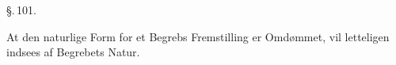\documentclass[12pt]{book}
\def\sperr#1{#1}%
\def\textit#1{#1}%
\newcommand{\sperr}[1]{\textls[180]{#1}}
\newcommand{\capitel}[2]{%
  \par\vspace{1.3\baselineskip}%
  \begin{center}
    {\large\sperr{#1}\par}\vspace{0.45\baselineskip}
    {#2\par}
  \end{center}
  \vspace{0.35\baselineskip}
  \begin{center}\rule{0.13\linewidth}{1.4pt}\end{center}
  \vspace{0.45\baselineskip}
  \phantomsection
  \addcontentsline{toc}{chapter}{\texorpdfstring{#1\ #2}{#1 #2}}%
  \markboth{#1}{#1}%
}
\newcommand{\parag}[1]{%
  \par\vspace{0.9\baselineskip}%
  {\centering\textit{\S.\,#1.}\par}%
  \vspace{0.35\baselineskip}%
  \noindent\hspace{\parindent}\ignorespaces
}
\newcommand{\opage}[1]{\marginnote{\footnotesize\textit{[#1]}}}
\begin{document}
\opage{246} %

\parag{101}

At den naturlige Form for et Begrebs Fremstilling er Omdømmet, vil letteligen indsees
af Begrebets Natur.
\end{document}
